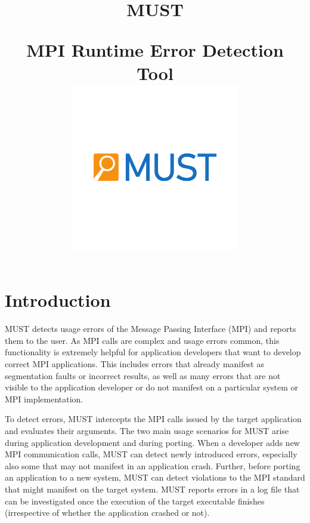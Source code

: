 \documentclass[english]{scrartcl}
\begin{document}
\title{\textsf{\textcolor{blue}{\Huge}}\\
\begin{center}
MUST
\end{center}
\textsf{\large MPI Runtime Error Detection Tool}\\
\vspace{8ex}
\centering\includegraphics[width=0.55\textwidth]{logo.pdf}
}
\maketitle

\newpage{}

\tableofcontents{}

\newpage{}

\section{Introduction}

MUST detects usage errors of the Message Passing Interface (MPI) and reports
them to the user.
As MPI calls are complex and usage errors common, this functionality is
extremely helpful for application developers that want to develop correct MPI applications.
This includes errors that already manifest as segmentation faults or incorrect
results, as well as many errors that are not visible to the application
developer or do not manifest on a particular system or MPI implementation. 

To detect errors, MUST intercepts the MPI calls issued by the target
application and evaluates their arguments. The two main usage
scenarios for MUST arise during application development and during porting.
When a developer adds new MPI communication calls, MUST can detect
newly introduced errors, especially also some that may not manifest in an
application crash. Further,
before porting an application to a new system, MUST can detect violations to the
MPI standard that might manifest on the target system. MUST reports errors
in a log file that can be investigated once the execution of the target
executable finishes (irrespective of whether the application crashed or not).
\end{document}
